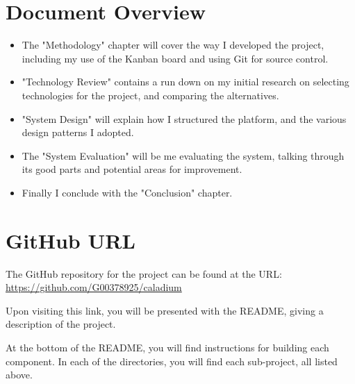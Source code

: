 
\section{Document Overview}
\begin{itemize}
  \item The "Methodology" chapter will cover the way I developed the project,
  including my use of the Kanban board and using Git for source control.
  \item "Technology Review" contains a run down on my initial research on selecting
  technologies for the project, and comparing the alternatives.
  \item "System Design" will explain how I structured the platform,
  and the various design patterns I adopted.
  \item The "System Evaluation" will be me evaluating the system,
  talking through its good parts and potential areas for improvement.
  \item Finally I conclude with the "Conclusion" chapter.
\end{itemize}

\section{GitHub URL}
The GitHub repository for the project can be found at the URL: \\
\href{https://github.com/G00378925/caladium}{https://github.com/G00378925/caladium}

Upon visiting this link,
you will be presented with the README,
giving a description of the project.

At the bottom of the README,
you will find instructions for building each component.
In each of the directories, you will find each sub-project,
all listed above.
